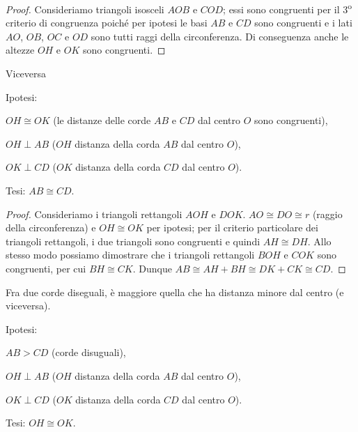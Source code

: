 \begin{proof}
Consideriamo triangoli isosceli $AOB$ e $COD$; essi sono congruenti per il 3\textsuperscript{o} criterio di congruenza poiché per ipotesi le basi $AB$ e $CD$ sono congruenti e i lati $AO$, $OB$, $OC$ e $OD$ sono tutti raggi della circonferenza.
Di conseguenza anche le altezze $OH$ e $OK$ sono congruenti.
\end{proof}

Viceversa

\noindent Ipotesi:
\begin{itemize*}
\item $OH\cong OK$ (le distanze delle corde $AB$ e $CD$ dal centro $O$ sono congruenti),
\item $OH\perp AB$ ($OH$ distanza della corda $AB$ dal centro $O$),
\item $OK\perp CD$ ($OK$ distanza della corda $CD$ dal centro $O$).
\end{itemize*}
\noindent Tesi: $AB\cong CD$.

\begin{proof}
Consideriamo i triangoli rettangoli $AOH$ e $DOK$. $AO\cong DO\cong r$ (raggio della circonferenza) e $OH\cong OK$ per ipotesi; per il criterio particolare dei triangoli rettangoli, i due triangoli sono congruenti e quindi $AH\cong DH$. Allo stesso modo possiamo dimostrare che i triangoli rettangoli $BOH$ e $COK$ sono congruenti, per cui $BH\cong CK$. Dunque $AB \cong AH + BH \cong DK + CK \cong CD$.
\end{proof}

\begin{teorema}
Fra due corde diseguali, è maggiore quella che ha distanza minore dal centro (e viceversa).
\end{teorema}

\noindent Ipotesi:
\begin{itemize*}
\item $AB>CD$ (corde disuguali),
\item $OH\perp AB$ ($OH$ distanza della corda $AB$ dal centro $O$),
\item $OK\perp CD$ ($OK$ distanza della corda $CD$ dal centro $O$).
\end{itemize*}
\noindent Tesi: $OH\cong OK$.

